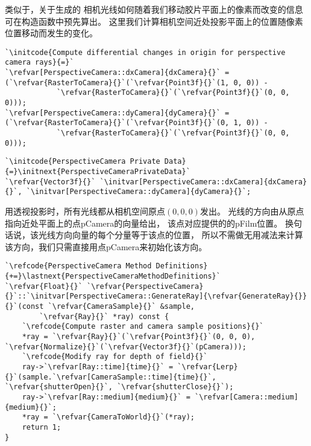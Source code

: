 类似于，关于生成的
相机光线如何随着我们移动胶片平面上的像素而改变的信息可在构造函数中预先算出。
这里我们计算相机空间近处投影平面上的位置随像素位置移动而发生的变化。
\begin{lstlisting}
`\initcode{Compute differential changes in origin for perspective camera rays}{=}`
`\refvar[PerspectiveCamera::dxCamera]{dxCamera}{}` = (`\refvar{RasterToCamera}{}`(`\refvar{Point3f}{}`(1, 0, 0)) -
            `\refvar{RasterToCamera}{}`(`\refvar{Point3f}{}`(0, 0, 0)));
`\refvar[PerspectiveCamera::dyCamera]{dyCamera}{}` = (`\refvar{RasterToCamera}{}`(`\refvar{Point3f}{}`(0, 1, 0)) -
            `\refvar{RasterToCamera}{}`(`\refvar{Point3f}{}`(0, 0, 0)));
\end{lstlisting}
\begin{lstlisting}
`\initcode{PerspectiveCamera Private Data}{=}\initnext{PerspectiveCameraPrivateData}`
`\refvar{Vector3f}{}` `\initvar[PerspectiveCamera::dxCamera]{dxCamera}{}`, `\initvar[PerspectiveCamera::dyCamera]{dyCamera}{}`;
\end{lstlisting}

用透视投影时，所有光线都从相机空间原点$(0,0,0)$发出。
光线的方向由从原点指向近处平面上的点{\ttfamily pCamera}的向量给出，
该点对应提供的的{\ttfamily pFilm}位置。
换句话说，该光线方向向量的每个分量等于该点的位置，
所以不需做无用减法来计算该方向，我们只需直接用点{\ttfamily pCamera}来初始化该方向。
\begin{lstlisting}
`\refcode{PerspectiveCamera Method Definitions}{+=}\lastnext{PerspectiveCameraMethodDefinitions}`
`\refvar{Float}{}` `\refvar{PerspectiveCamera}{}`::`\initvar[PerspectiveCamera::GenerateRay]{\refvar{GenerateRay}{}}{}`(const `\refvar{CameraSample}{}` &sample,
        `\refvar{Ray}{}` *ray) const {
    `\refcode{Compute raster and camera sample positions}{}`
    *ray = `\refvar{Ray}{}`(`\refvar{Point3f}{}`(0, 0, 0), `\refvar{Normalize}{}`(`\refvar{Vector3f}{}`(pCamera)));
    `\refcode{Modify ray for depth of field}{}`
    ray->`\refvar[Ray::time]{time}{}` = `\refvar{Lerp}{}`(sample.`\refvar[CameraSample::time]{time}{}`, `\refvar{shutterOpen}{}`, `\refvar{shutterClose}{}`);
    ray->`\refvar[Ray::medium]{medium}{}` = `\refvar[Camera::medium]{medium}{}`;
    *ray = `\refvar{CameraToWorld}{}`(*ray);
    return 1;
}
\end{lstlisting}

